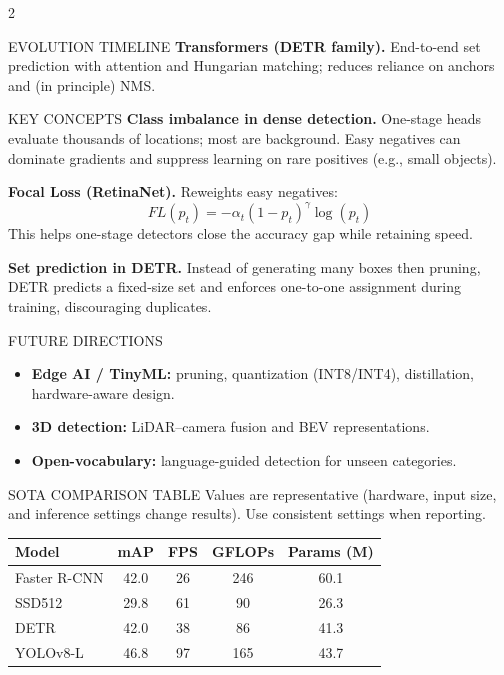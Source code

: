 \documentclass[10pt]{article}
\begin{document}
\begin{multicols}{2}
\begin{sectionbox}{EVOLUTION TIMELINE}
\textbf{Transformers (DETR family).}
End-to-end set prediction with attention and Hungarian matching; reduces reliance on anchors and (in principle) NMS.
\end{sectionbox}

\begin{sectionbox}{KEY CONCEPTS}
\small
\textbf{Class imbalance in dense detection.}
One-stage heads evaluate thousands of locations; most are background. Easy negatives can dominate gradients and suppress learning on rare positives (e.g., small objects).

\textbf{Focal Loss (RetinaNet).} Reweights easy negatives:
\[
FL(p_t) = -\alpha_t (1 - p_t)^\gamma \log(p_t)
\]
This helps one-stage detectors close the accuracy gap while retaining speed.

\textbf{Set prediction in DETR.}
Instead of generating many boxes then pruning, DETR predicts a fixed-size set and enforces one-to-one assignment during training, discouraging duplicates.
\end{sectionbox}

\begin{sectionbox}{FUTURE DIRECTIONS}
\small
\begin{itemize}
\item \textbf{Edge AI / TinyML:} pruning, quantization (INT8/INT4), distillation, hardware-aware design.
\item \textbf{3D detection:} LiDAR--camera fusion and BEV representations.
\item \textbf{Open-vocabulary:} language-guided detection for unseen categories.
\end{itemize}
\end{sectionbox}

\begin{sectionbox}{SOTA COMPARISON TABLE}
\small
Values are representative (hardware, input size, and inference settings change results). Use consistent settings when reporting.

\vspace{1mm}
\centering
\footnotesize
\begin{tabular}{lcccc}
\toprule
\textbf{Model} & \textbf{mAP} & \textbf{FPS} & \textbf{GFLOPs} & \textbf{Params (M)} \\
\midrule
Faster R-CNN & 42.0 & 26 & 246 & 60.1 \\
SSD512       & 29.8 & 61 & 90  & 26.3 \\
DETR         & 42.0 & 38 & 86  & 41.3 \\
YOLOv8-L     & 46.8 & 97 & 165 & 43.7 \\
\bottomrule
\end{tabular}


\end{sectionbox}
\end{multicols}
\end{document}
